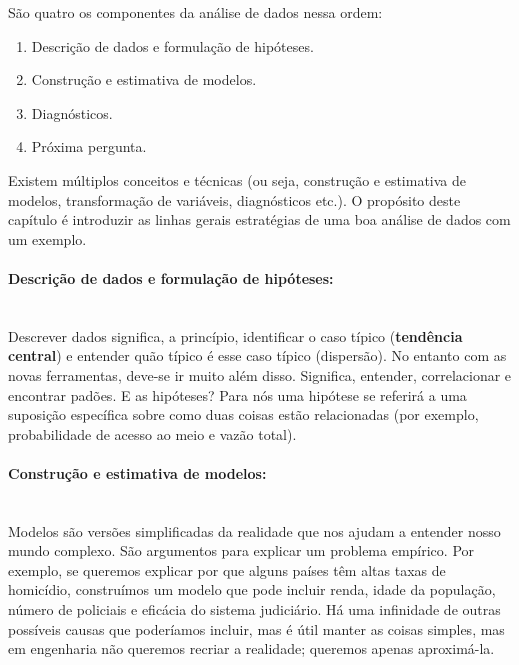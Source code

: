 \documentclass[article]{memoir}
\begin{document}
São quatro os componentes da análise de dados  nessa ordem: 
\begin{enumerate}
	\item Descrição de dados e formulação de hipóteses.
	\item Construção e estimativa de modelos. 
	\item Diagnósticos.
	\item Próxima pergunta. 
\end{enumerate}

	Existem múltiplos conceitos e técnicas (ou seja, construção e estimativa de modelos, transformação de variáveis, diagnósticos etc.). O propósito deste capítulo é introduzir as linhas gerais estratégias de uma boa análise de dados com um exemplo. 

\paragraph*{Descrição de dados e formulação de hipóteses:}\mbox{}\\

Descrever dados significa, a princípio, identificar o caso típico (\textbf{tendência central}) e entender quão típico é esse caso típico (dispersão). No entanto com as novas ferramentas, deve-se ir muito além disso. Significa, entender, correlacionar e encontrar padões.
E as hipóteses? Para nós uma hipótese se referirá a uma suposição específica sobre como duas coisas estão relacionadas (por exemplo, probabilidade de acesso ao meio e vazão total). 

\paragraph*{Construção e estimativa de modelos:}\mbox{}\\

Modelos são versões simplificadas da realidade que nos ajudam a entender nosso mundo complexo. São argumentos  para explicar um problema empírico. Por exemplo, se queremos explicar por que alguns países têm altas taxas de homicídio, construímos um modelo que pode incluir renda, idade da população, número de policiais e eficácia do sistema judiciário. Há uma infinidade de outras possíveis causas que poderíamos incluir, mas é útil manter as coisas simples, mas em engenharia não queremos recriar a realidade; queremos apenas aproximá-la. 
\end{document}
